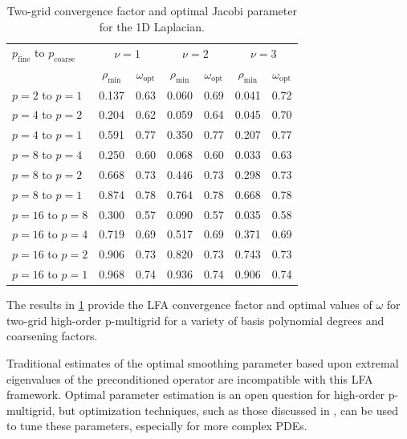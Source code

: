 \documentclass[review]{siamart190516}
\begin{document}
\begin{table}[ht!]
\begin{center}
\begin{tabular}{l cc cc cc}
  \toprule
  $p_{\text{fine}}$ to $p_{\text{coarse}}$  &  \multicolumn{2}{c}{$\nu = 1$}  &  \multicolumn{2}{c}{$\nu = 2$}  &  \multicolumn{2}{c}{$\nu = 3$}  \\
                       &  $\rho_{\min}$ & $\omega_{\text{opt}}$  &  $\rho_{\min}$ & $\omega_{\text{opt}}$  &  $\rho_{\min}$ & $\omega_{\text{opt}}$  \\
  \toprule
  $p = 2$ to $p = 1$   &  0.137 & 0.63  &  0.060 & 0.69  &  0.041 & 0.72   \\
  \midrule
  $p = 4$ to $p = 2$   &  0.204 & 0.62  &  0.059 & 0.64  &  0.045 & 0.70   \\
  $p = 4$ to $p = 1$   &  0.591 & 0.77  &  0.350 & 0.77  &  0.207 & 0.77   \\
  \midrule
  $p = 8$ to $p = 4$   &  0.250 & 0.60  &  0.068 & 0.60  &  0.033 & 0.63   \\
  $p = 8$ to $p = 2$   &  0.668 & 0.73  &  0.446 & 0.73  &  0.298 & 0.73   \\
  $p = 8$ to $p = 1$   &  0.874 & 0.78  &  0.764 & 0.78  &  0.668 & 0.78   \\
  \midrule
  $p = 16$ to $p = 8$  &  0.300 & 0.57  &  0.090 & 0.57  &  0.035 & 0.58   \\
  $p = 16$ to $p = 4$  &  0.719 & 0.69  &  0.517 & 0.69  &  0.371 & 0.69   \\
  $p = 16$ to $p = 2$  &  0.906 & 0.73  &  0.820 & 0.73  &  0.743 & 0.73   \\
  $p = 16$ to $p = 1$  &  0.968 & 0.74  &  0.936 & 0.74  &  0.906 & 0.74   \\
  \bottomrule
\end{tabular}
\end{center}
\caption{Two-grid convergence factor and optimal Jacobi parameter for the 1D Laplacian.}
\label{table:two_grid_1d}
\end{table}

The results in \cref{table:two_grid_1d} provide the LFA convergence factor and optimal values of $\omega$ for two-grid high-order p-multigrid for a variety of basis polynomial degrees and coarsening factors.

Traditional estimates of the optimal smoothing parameter based upon extremal eigenvalues of the preconditioned operator are incompatible with this LFA framework.
Optimal parameter estimation is an open question for high-order p-multigrid, but optimization techniques, such as those discussed in \cite{brown2021tuning}, can be used to tune these parameters, especially for more complex PDEs.
\end{document}
